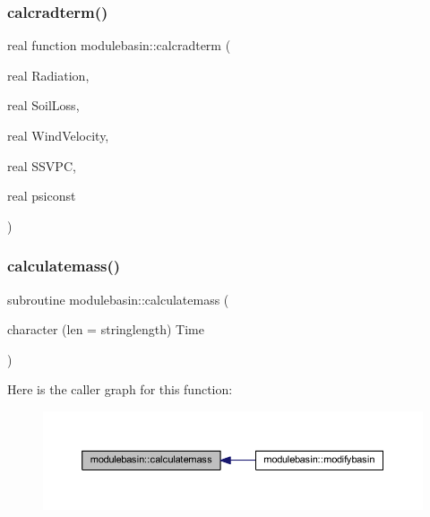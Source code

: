 \subsubsection{\texorpdfstring{calcradterm()}{calcradterm()}}
{\footnotesize\ttfamily real function modulebasin\+::calcradterm (\begin{DoxyParamCaption}\item[{real}]{Radiation,  }\item[{real}]{Soil\+Loss,  }\item[{real}]{Wind\+Velocity,  }\item[{real}]{S\+S\+V\+PC,  }\item[{real}]{psiconst }\end{DoxyParamCaption})\hspace{0.3cm}{\ttfamily [private]}}

\mbox{\label{namespacemodulebasin_af1427c4ade7156552be2283259050d1d}} 
\subsubsection{\texorpdfstring{calculatemass()}{calculatemass()}}
{\footnotesize\ttfamily subroutine modulebasin\+::calculatemass (\begin{DoxyParamCaption}\item[{character (len = stringlength)}]{Time }\end{DoxyParamCaption})\hspace{0.3cm}{\ttfamily [private]}}

Here is the caller graph for this function\+:\nopagebreak
\begin{figure}[H]
\begin{center}
\leavevmode
\includegraphics[width=350pt]{namespacemodulebasin_af1427c4ade7156552be2283259050d1d_icgraph}
\end{center}
\end{figure}
\mbox{\label{namespacemodulebasin_a00fd3009ac96d7478c5ad365f4438954}} 
